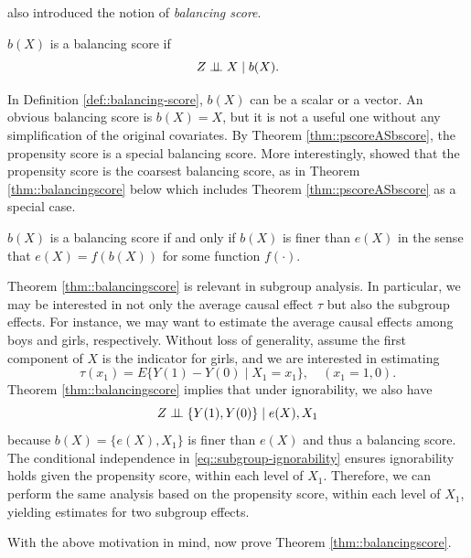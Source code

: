 \begin{HomeworkProblem}\label{exr:11-5}


\citet{rosenbaum1983central} also introduced the notion of {\it balancing score}.

\begin{definition}
\label{def::balancing-score}
  $b(X)$ is a balancing score if
  \[
  Z\mathrel{\perp\!\!\!\perp} X\mid b(X).
  \]
\end{definition}

In Definition \ref{def::balancing-score},  $b(X)$ can be a scalar or a vector. An obvious balancing score is $b(X) = X$, but it is not a useful one without any simplification of the original covariates. By Theorem \ref{thm::pscoreASbscore}, the propensity score is a special balancing score. More interestingly, \citet{rosenbaum1983central} showed that the propensity score is the coarsest balancing score, as in Theorem \ref{thm::balancingscore} below which includes Theorem \ref{thm::pscoreASbscore} as a special case.


\begin{Theorem}
\label{thm::balancingscore}
$b(X)$ is a balancing score if and only if $b(X)$ is finer than $e(X)$ in the sense that $e(X) = f(b(X))$ for some function $f(\cdot)$.
\end{Theorem}


Theorem \ref{thm::balancingscore} is relevant in subgroup analysis. In particular, we may be interested in not only the average causal effect $\tau$ but also the subgroup effects. For instance, we may want to estimate the average causal effects among boys and girls, respectively. Without loss of generality, assume the first component of $X$ is the indicator for girls, and we are interested in estimating
\[
\tau(x_1) = E\{ Y(1) - Y(0) \mid X_1 = x_1  \},\quad (x_1=1,0).
\]
Theorem \ref{thm::balancingscore} implies that under ignorability, we also have
\begin{equation}
Z\mathrel{\perp\!\!\!\perp} \{ Y(1) , Y(0) \} \mid e(X), X_1
\end{equation}
because $b(X) = \{e(X), X_1\}$ is finer than $e(X)$ and thus a balancing score. The conditional independence in \eqref{eq::subgroup-ignorability} ensures ignorability holds given the propensity score, within each level of $X_1$. Therefore, we can perform the same analysis based on the propensity score, within each level of $X_1$, yielding estimates for two subgroup effects.


With the above motivation in mind, now prove Theorem \ref{thm::balancingscore}.


\end{HomeworkProblem}

